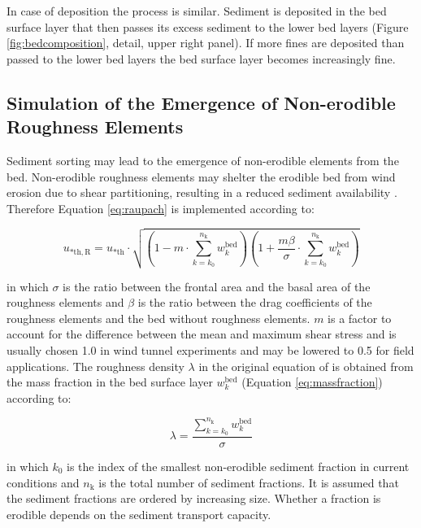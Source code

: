 In case of deposition the process is similar. Sediment is deposited in
the bed surface layer that then passes its excess sediment to the
lower bed layers (Figure \ref{fig:bedcomposition}, detail, upper right
panel). If more fines are deposited than passed to the lower bed
layers the bed surface layer becomes increasingly fine.

\subsection{Simulation of the Emergence of Non-erodible Roughness
  Elements} \label{sec:roughness}

Sediment sorting may lead to the emergence of non-erodible elements
from the bed. Non-erodible roughness elements may shelter the
erodible bed from wind erosion due to shear partitioning, resulting in
a reduced sediment availability \citep{Raupach1993}. Therefore
Equation \ref{eq:raupach} is implemented according to:

\begin{equation} \label{eq:raupach2}
u_{\mathrm{* th, R}} = u_{\mathrm{* th}} \cdot \sqrt{ \left( 1 - m \cdot \sum_{k=k_0}^{n_{\mathrm{k}}}{w_k^{\mathrm{bed}}} \right) \left( 1 + \frac{m \beta}{\sigma} \cdot \sum_{k=k_0}^{n_{\mathrm{k}}}{w_k^{\mathrm{bed}}} \right) }
\end{equation}

\noindent in which $\sigma$ is the ratio between the frontal area and
the basal area of the roughness elements and $\beta$ is the ratio
between the drag coefficients of the roughness elements and the bed
without roughness elements. $m$ is a factor to account for the
difference between the mean and maximum shear stress and is usually
chosen 1.0 in wind tunnel experiments and may be lowered to 0.5 for
field applications. The roughness density $\lambda$ in the original
equation of \citet[][Equation \ref{eq:raupach}]{Raupach1993} is
obtained from the mass fraction in the bed surface layer $w_k^{\mathrm{bed}}$
(Equation \ref{eq:massfraction}) according to:

\begin{equation}
\label{eq:roughness_density}
\lambda = \frac{\sum_{k=k_0}^{n_{\mathrm{k}}}{w_k^{\mathrm{bed}}}}{\sigma}
\end{equation}

\noindent in which $k_0$ is the index of the smallest non-erodible
sediment fraction in current conditions and $n_{\mathrm{k}}$ is the
total number of sediment fractions. It is assumed that the sediment
fractions are ordered by increasing size. Whether a fraction is
erodible depends on the sediment transport capacity.

